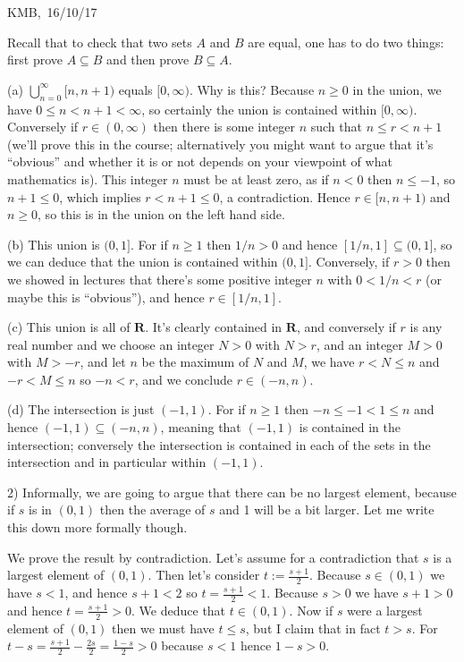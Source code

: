 \documentclass[10pt]{article}
\newcommand{\R}{\mathbf{R}}
\begin{document}
\begin{flushright} KMB,\ 16/10/17\end{flushright}


\medskip
{} Recall that to check that two sets $A$ and $B$ are equal, one has to do two things: first prove $A\subseteq B$ and then prove $B\subseteq A$.

(a) $\bigcup_{n=0}^\infty[n,n+1)$ equals $[0,\infty)$. Why is this? Because $n\geq0$ in the union, we have $0\leq n<n+1<\infty$, so certainly the union is contained within $[0,\infty)$. Conversely if $r\in(0,\infty)$ then there is some integer $n$ such that $n\leq r<n+1$ (we'll prove this in the course; alternatively you might want to argue that it's ``obvious'' and whether it is or not depends on your viewpoint of what mathematics is). This integer $n$ must be at least zero, as if $n<0$ then $n\leq -1$, so $n+1\leq 0$, which implies $r<n+1\leq 0$, a contradiction. Hence $r\in[n,n+1)$ and $n\geq0$, so this is in the union on the left hand side.

(b) This union is $(0,1]$. For if $n\geq1$ then $1/n>0$ and hence $[1/n,1]\subseteq (0,1]$, so we can deduce that the union is contained within $(0,1]$. Conversely, if $r>0$ then we showed in lectures that there's some positive integer $n$ with $0<1/n<r$ (or maybe this is ``obvious''), and hence $r\in[1/n,1]$.

(c) This union is all of $\R$. It's clearly contained in $\R$, and conversely if $r$ is any real number and we choose an integer $N>0$ with $N>r$, and an integer $M>0$ with $M>-r$, and let $n$ be the maximum of $N$ and $M$, we have $r<N\leq n$ and $-r<M\leq n$ so $-n<r$, and we conclude $r\in(-n,n)$.

(d) The intersection is just $(-1,1)$. For if $n\geq1$ then $-n\leq -1<1\leq n$ and hence $(-1,1)\subseteq(-n,n)$, meaning that $(-1,1)$ is contained in the intersection; conversely the intersection is contained in each of the sets in the intersection and in particular within $(-1,1)$.

\medskip

2) Informally, we are going to argue that there can be no largest element, because if $s$ is in $(0,1)$ then the average of $s$ and 1 will be a bit larger. Let me write this down more formally though.

We prove the result by contradiction. Let's assume for a contradiction that $s$ is a largest element of $(0,1)$. Then let's consider $t:=\frac{s+1}{2}$. Because $s\in(0,1)$ we have $s<1$, and hence $s+1<2$ so $t=\frac{s+1}{2}<1$. Because $s>0$ we have $s+1>0$ and hence $t=\frac{s+1}{2}>0$. We deduce that $t\in(0,1)$. Now if $s$ were a largest element of $(0,1)$ then we must have $t\leq s$, but I claim that in fact $t>s$. For $t-s=\frac{s+1}{2}-\frac{2s}{2}=\frac{1-s}{2}>0$ because $s<1$ hence $1-s>0$.
\end{document}
